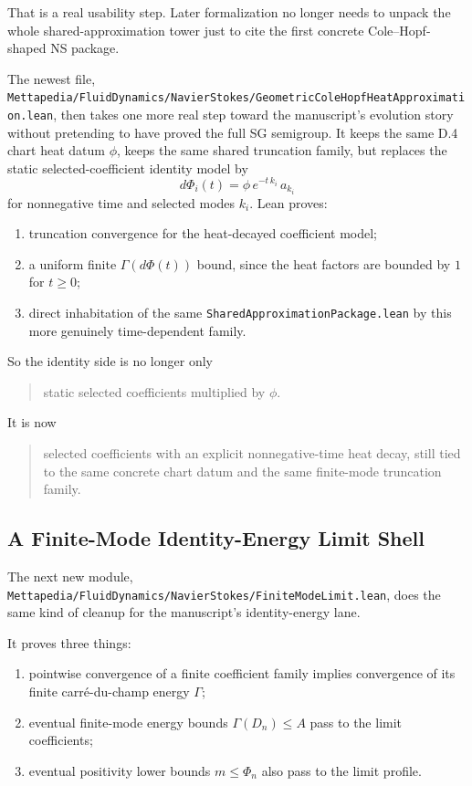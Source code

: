 \documentclass[11pt]{article}
\theoremstyle{remark}
\begin{document}
That is a real usability step.  Later formalization no longer needs to unpack
the whole shared-approximation tower just to cite the first concrete
Cole--Hopf-shaped NS package.

The newest file,
\texttt{Mettapedia/FluidDynamics/NavierStokes/GeometricColeHopfHeatApproximation.lean},
then takes one more real step toward the manuscript's evolution story without
pretending to have proved the full SG semigroup.  It keeps the same D.4 chart
heat datum \(\phi\), keeps the same shared truncation family, but replaces the
static selected-coefficient identity model by
\[
  d\Phi_i(t) = \phi \, e^{-t\,k_i}\, a_{k_i}
\]
for nonnegative time and selected modes \(k_i\).  Lean proves:
\begin{enumerate}[leftmargin=1.5em]
  \item truncation convergence for the heat-decayed coefficient model;
  \item a uniform finite \(\Gamma(d\Phi(t))\) bound, since the heat factors are
  bounded by \(1\) for \(t \ge 0\);
  \item direct inhabitation of the same
  \texttt{SharedApproximationPackage.lean} by this more genuinely
  time-dependent family.
\end{enumerate}

So the identity side is no longer only
\begin{quote}
static selected coefficients multiplied by \(\phi\).
\end{quote}
It is now
\begin{quote}
selected coefficients with an explicit nonnegative-time heat decay, still tied
to the same concrete chart datum and the same finite-mode truncation family.
\end{quote}

\subsection{A Finite-Mode Identity-Energy Limit Shell}

The next new module,
\texttt{Mettapedia/FluidDynamics/NavierStokes/FiniteModeLimit.lean},
does the same kind of cleanup for the manuscript's identity-energy lane.

It proves three things:
\begin{enumerate}[leftmargin=1.5em]
  \item pointwise convergence of a finite coefficient family implies convergence
  of its finite carré-du-champ energy \(\Gamma\);
  \item eventual finite-mode energy bounds \(\Gamma(D_n)\le A\) pass to the
  limit coefficients;
  \item eventual positivity lower bounds \(m \le \Phi_n\) also pass to the
  limit profile.
\end{enumerate}
\end{document}
